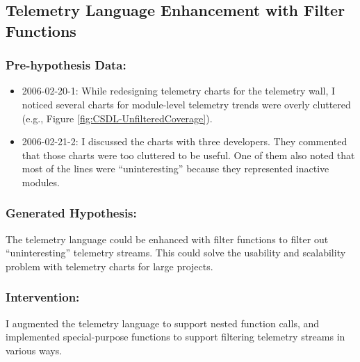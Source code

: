 \clearpage
\subsection{Telemetry Language Enhancement with Filter Functions}
\label{EvaluationInCSDL:EventsDescription:FilterFunction}

\subsubsection{Pre-hypothesis Data:}
\begin{itemize}
  \setlength{\itemsep}{0pt}
  \setlength{\parskip}{0pt}
    \item 2006-02-20-1: While redesigning telemetry charts for the telemetry wall, I noticed several charts for module-level telemetry trends were overly cluttered (e.g., Figure \ref{fig:CSDL-UnfilteredCoverage}).
    \item 2006-02-21-2: I discussed the charts with three developers. They commented that those charts were too cluttered to be useful. One of them also noted that most of the lines were ``uninteresting'' because they represented inactive modules.
\end{itemize}

\subsubsection{Generated Hypothesis:}

The telemetry language could be enhanced with filter functions to filter out ``uninteresting'' telemetry streams. This could solve the usability and scalability problem with telemetry charts for large projects.  

\subsubsection{Intervention:}

I augmented the telemetry language to support nested function calls, and implemented special-purpose functions to support filtering telemetry streams in various ways.

